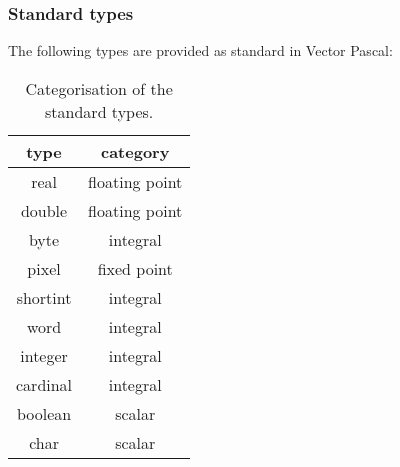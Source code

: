 \subsubsection{Standard types}\label{auxtypes}

The following types are provided as standard in Vector Pascal:
\begin{table}

\caption{Categorisation of the standard types.}
{\centering \begin{tabular}{|c|c|}
\hline 
type&
category\\
\hline 
\hline 
real&
floating point\\
\hline 
double&
floating point\\
\hline 
byte&
integral\\
\hline 
pixel&
fixed point\\
\hline 
shortint&
integral\\
\hline 
word&
integral\\
\hline 
integer&
integral\\
\hline 
cardinal&
integral\\
\hline 
boolean&
scalar\\
\hline 
char&
scalar\\
\hline 
\end{tabular}\par}\end{table}


